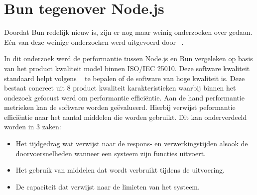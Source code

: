 \section{Bun tegenover Node.js}
Doordat Bun redelijk nieuw is, zijn er nog maar weinig onderzoeken over gedaan. Eén van deze weinige
onderzoeken werd uitgevoerd door ~\textcite{Feroj2023}. 

In dit onderzoek werd de performantie tussen Node.js en Bun vergeleken op basis van het product kwaliteit model binnen ISO/IEC 25010.
Deze software kwaliteit standaard helpt volgens ~\textcite{Britton2021} te bepalen of de software van hoge kwaliteit is.
Deze bestaat concreet uit 8 product kwaliteit karakteristieken waarbij binnen het ondezoek gefocust werd om performantie efficiëntie.
Aan de hand performantie metrieken kan de software worden geëvalueerd. 
Hierbij verwijst peformantie efficiëntie naar het aantal middelen die worden gebruikt.
Dit kan onderverdeeld worden in 3 zaken:
\begin{itemize}
    \item Het tijdgedrag wat verwijst naar de respons- en verwerkingstijden alsook de doorvoersnelheden wanneer een systeem zijn functies uitvoert.
    \item Het gebruik van middelen dat wordt verbruikt tijdens de uitvoering.
    \item De capaciteit dat verwijst naar de limieten van het systeem.
\end{itemize}



